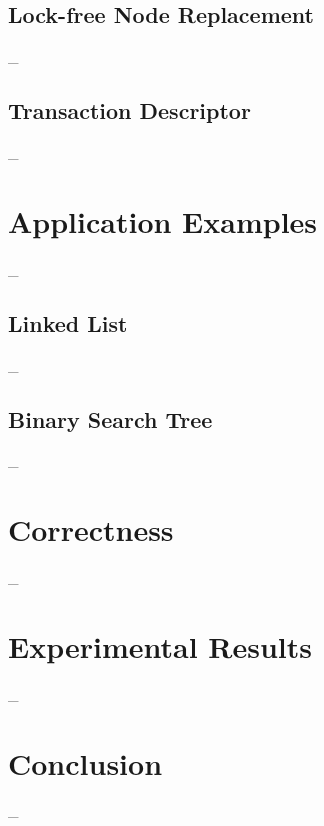 \documentclass[10pt,conference,compsocconf]{IEEEtran}
\begin{document}
\subsection{Lock-free Node Replacement}
\label{sec:noderepl}
\_


\subsection{Transaction Descriptor}
\label{sec:txndesc}
\_

\section{Application Examples}
\label{sec:application}
\_

\subsection{Linked List}
\_

\subsection{Binary Search Tree}
\_

\section{Correctness}
\label{sec:correctness}
\_

\section{Experimental Results}
\label{sec:experiment}
\_

\section{Conclusion}
\label{sec:conclusion}
\_




\end{document}
